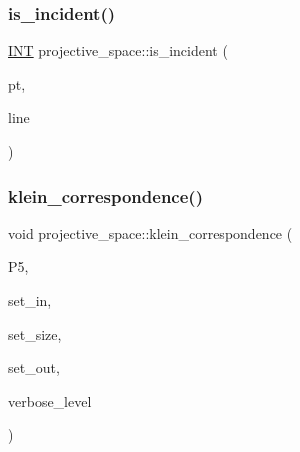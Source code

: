 \mbox{\label{classprojective__space_a225780a9f3d266bc425b3be0cf5bc0ff}} 
\subsubsection{\texorpdfstring{is\+\_\+incident()}{is\_incident()}}
{\footnotesize\ttfamily \mbox{\hyperlink{galois_8h_a09fddde158a3a20bd2dcadb609de11dc}{I\+NT}} projective\+\_\+space\+::is\+\_\+incident (\begin{DoxyParamCaption}\item[{\mbox{\hyperlink{galois_8h_a09fddde158a3a20bd2dcadb609de11dc}{I\+NT}}}]{pt,  }\item[{\mbox{\hyperlink{galois_8h_a09fddde158a3a20bd2dcadb609de11dc}{I\+NT}}}]{line }\end{DoxyParamCaption})}

\mbox{\label{classprojective__space_a2712ead7fd87ca75ac227a8ade786508}} 
\subsubsection{\texorpdfstring{klein\+\_\+correspondence()}{klein\_correspondence()}}
{\footnotesize\ttfamily void projective\+\_\+space\+::klein\+\_\+correspondence (\begin{DoxyParamCaption}\item[{\mbox{\hyperlink{classprojective__space}{projective\+\_\+space}} $\ast$}]{P5,  }\item[{\mbox{\hyperlink{galois_8h_a09fddde158a3a20bd2dcadb609de11dc}{I\+NT}} $\ast$}]{set\+\_\+in,  }\item[{\mbox{\hyperlink{galois_8h_a09fddde158a3a20bd2dcadb609de11dc}{I\+NT}}}]{set\+\_\+size,  }\item[{\mbox{\hyperlink{galois_8h_a09fddde158a3a20bd2dcadb609de11dc}{I\+NT}} $\ast$}]{set\+\_\+out,  }\item[{\mbox{\hyperlink{galois_8h_a09fddde158a3a20bd2dcadb609de11dc}{I\+NT}}}]{verbose\+\_\+level }\end{DoxyParamCaption})}

